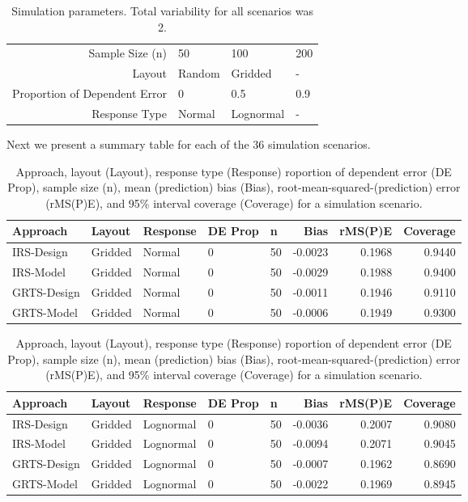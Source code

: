 \documentclass[]{elsarticle} %
\begin{document}
\begin{table}[ht]
\centering
\begin{tabular}{r|lll}
   \hline
Sample Size (n) & 50 & 100 & 200 \\ 
  Layout & Random & Gridded & - \\ 
  Proportion of Dependent Error & 0 & 0.5 & 0.9 \\ 
  Response Type & Normal & Lognormal & - \\ 
   \hline
\end{tabular}
\caption{\label{tab:parmtab} Simulation parameters. Total variability for all scenarios was 2.} 
\end{table}

Next we present a summary table for each of the 36 simulation scenarios.

\begin{table}[ht]
\centering
\begin{tabular}{lllllrrr}
  \hline
Approach & Layout & Response & DE Prop & n & Bias & rMS(P)E & Coverage \\ 
  \hline
IRS-Design & Gridded & Normal & 0 & 50 & -0.0023 & 0.1968 & 0.9440 \\ 
  IRS-Model & Gridded & Normal & 0 & 50 & -0.0029 & 0.1988 & 0.9400 \\ 
  GRTS-Design & Gridded & Normal & 0 & 50 & -0.0011 & 0.1946 & 0.9110 \\ 
  GRTS-Model & Gridded & Normal & 0 & 50 & -0.0006 & 0.1949 & 0.9300 \\ 
   \hline
\end{tabular}
\caption{Approach, layout (Layout), response type (Response) roportion of dependent error (DE Prop), sample size (n), mean (prediction) bias (Bias), root-mean-squared-(prediction) error (rMS(P)E), and 95\% interval coverage (Coverage) for a simulation scenario.} 
\end{table}
\begin{table}[ht]
\centering
\begin{tabular}{lllllrrr}
  \hline
Approach & Layout & Response & DE Prop & n & Bias & rMS(P)E & Coverage \\ 
  \hline
IRS-Design & Gridded & Lognormal & 0 & 50 & -0.0036 & 0.2007 & 0.9080 \\ 
  IRS-Model & Gridded & Lognormal & 0 & 50 & -0.0094 & 0.2071 & 0.9045 \\ 
  GRTS-Design & Gridded & Lognormal & 0 & 50 & -0.0007 & 0.1962 & 0.8690 \\ 
  GRTS-Model & Gridded & Lognormal & 0 & 50 & -0.0022 & 0.1969 & 0.8945 \\ 
   \hline
\end{tabular}
\caption{Approach, layout (Layout), response type (Response) roportion of dependent error (DE Prop), sample size (n), mean (prediction) bias (Bias), root-mean-squared-(prediction) error (rMS(P)E), and 95\% interval coverage (Coverage) for a simulation scenario.} 
\end{table}
\end{document}
